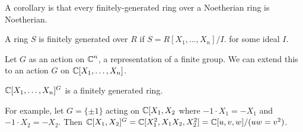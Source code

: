 A corollary is that every finitely-generated ring over a Noetherian ring is Noetherian.
\begin{definition}
A ring
$S$ is finitely generated over $R$ if $S = R[X_1, \dots, X_n]/I$. for some ideal $I$.
\end{definition}

Let $G$ as an action on $\operatorname{\mathbb{C}}^n$, a representation of a finite group. We can extend this to an action $G$ on $\operatorname{\mathbb{C}}[X_1, \dots, X_n]$.
\begin{theorem}
    $\operatorname{\mathbb{C}}[X_1, \dots, X_n]^G$ is a finitely generated ring.
\end{theorem}

For example, let $G = \{\pm 1\}$ acting on $\operatorname{\mathbb{C}}[X_1, X_2$ where $-1 \cdot X_1 = -X_1$ and $-1 \cdot X_2 = -X_2$.
Then $\operatorname{\mathbb{C}}[X_1, X_2]^G = \operatorname{\mathbb{C}}[X_1^2, X_1 X_2, X_2^2] = \operatorname{\mathbb{C}}[u, v, w]/(uw = v^2)$.